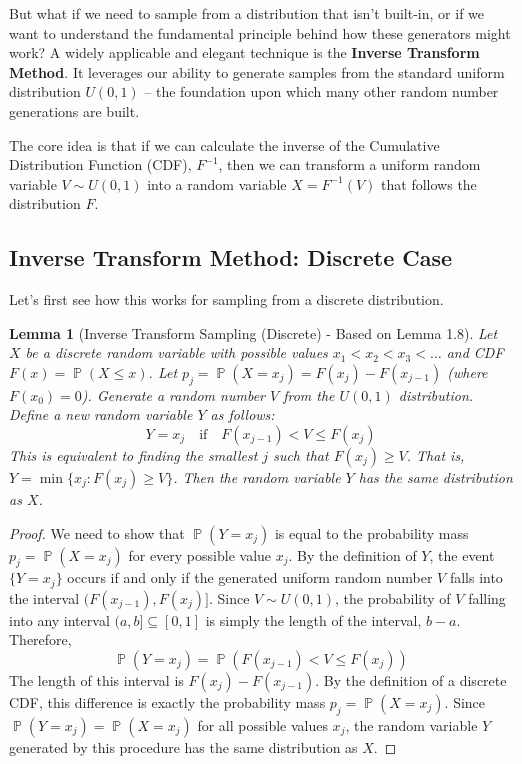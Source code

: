 \documentclass[11pt]{article}
\newtheorem{lemma}[theorem]{Lemma}
\theoremstyle{definition}
\theoremstyle{remark}
\DeclareMathOperator{\Prob}{\mathbb{P}} %
\begin{document}
But what if we need to sample from a distribution that isn't built-in, or if we want to understand the fundamental principle behind how these generators might work? A widely applicable and elegant technique is the \textbf{Inverse Transform Method}. It leverages our ability to generate samples from the standard uniform distribution $U(0, 1)$ – the foundation upon which many other random number generations are built.

The core idea is that if we can calculate the inverse of the Cumulative Distribution Function (CDF), $F^{-1}$, then we can transform a uniform random variable $V \sim U(0, 1)$ into a random variable $X = F^{-1}(V)$ that follows the distribution $F$.

\subsection{Inverse Transform Method: Discrete Case}

Let's first see how this works for sampling from a discrete distribution.

\begin{lemma}[Inverse Transform Sampling (Discrete) - Based on Lemma 1.8]
Let $X$ be a discrete random variable with possible values $x_1 < x_2 < x_3 < \dots$ and CDF $F(x) = \Prob(X \le x)$. Let $p_j = \Prob(X=x_j) = F(x_j) - F(x_{j-1})$ (where $F(x_0)=0$).
Generate a random number $V$ from the $U(0, 1)$ distribution. Define a new random variable $Y$ as follows:
\[ Y = x_j \quad \text{if} \quad F(x_{j-1}) < V \le F(x_j) \]
This is equivalent to finding the smallest $j$ such that $F(x_j) \ge V$. That is, $Y = \min \{ x_j : F(x_j) \ge V \}$.
Then the random variable $Y$ has the same distribution as $X$.
\end{lemma}

\begin{proof}
We need to show that $\Prob(Y = x_j)$ is equal to the probability mass $p_j = \Prob(X = x_j)$ for every possible value $x_j$.
By the definition of $Y$, the event $\{Y = x_j\}$ occurs if and only if the generated uniform random number $V$ falls into the interval $(F(x_{j-1}), F(x_j)]$.
Since $V \sim U(0, 1)$, the probability of $V$ falling into any interval $(a, b] \subseteq [0, 1]$ is simply the length of the interval, $b-a$.
Therefore,
\[
\Prob(Y = x_j) = \Prob(F(x_{j-1}) < V \le F(x_j))
\]
The length of this interval is $F(x_j) - F(x_{j-1})$. By the definition of a discrete CDF, this difference is exactly the probability mass $p_j = \Prob(X = x_j)$.
Since $\Prob(Y = x_j) = \Prob(X = x_j)$ for all possible values $x_j$, the random variable $Y$ generated by this procedure has the same distribution as $X$.
\end{proof}
\end{document}
